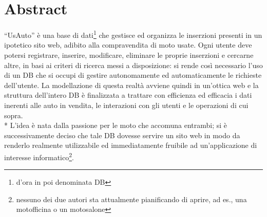  \section{Abstract}
	``UsAuto'' \`{e} una base di dati\footnote{d'ora in poi denominata DB} che gestisce ed organizza le inserzioni presenti in un ipotetico sito web, adibito alla compravendita di moto usate. Ogni utente deve potersi registrare, inserire, modificare, eliminare le proprie inserzioni e cercarne altre, in basi ai criteri di ricerca messi a disposizione: si rende cos\`{i} necessario l'uso di un DB che si occupi di gestire autonomamente ed automaticamente le richieste dell'utente. La modellazione di questa realt\`{a} avviene quindi in un'ottica web e la struttura dell'intero DB \`{e} finalizzata a trattare con efficienza ed efficacia i dati inerenti alle auto in vendita, le interazioni con gli utenti e le operazioni di cui sopra. \\*
	L'idea \`{e} nata dalla passione per le moto che accomuna entrambi; si \`{e} successivamente deciso che tale DB dovesse servire un sito web in modo da renderlo realmente utilizzabile ed immediatamente fruibile ad un'applicazione di interesse informatico\footnote{nessuno dei due autori sta attualmente pianificando di aprire, ad es., una motofficina o un motosalone}.